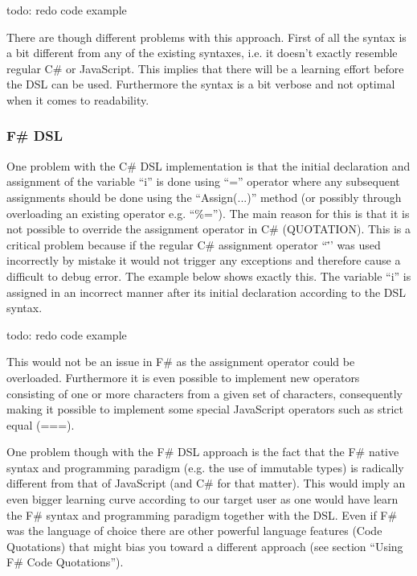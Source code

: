 			todo: redo code example

			There are though different problems with this approach. First of all the syntax is a bit different from any of the existing syntaxes, i.e. it doesn’t exactly resemble regular C\# or JavaScript. This implies that there will be a learning effort before the DSL can be used. Furthermore the syntax is a bit verbose and not optimal when it comes to readability.
		

		\subsubsection{F\# DSL} %
		\label{sub:fs_dsl}
			One problem with the C\# DSL implementation is that the initial declaration and assignment of the variable “i” is done using “=” operator where any subsequent assignments should be done using the ``Assign(...)'' method (or possibly through overloading an existing operator e.g. ``\%=''). The main reason for this is that it is not possible to override the assignment operator in C\# (QUOTATION). This is a critical problem because if the regular C\# assignment operator ``\='' was used incorrectly by mistake it would not trigger any exceptions and therefore cause a difficult to debug error.  The example below shows exactly this. The variable “i” is assigned in an incorrect manner after its initial declaration according to the DSL syntax.

			todo: redo code example

			This would not be an issue in F\# as the assignment operator could be overloaded. Furthermore it is even possible to implement new operators consisting of one or more characters from a given set of characters, consequently making it possible to implement some special JavaScript operators such as strict equal (===).

			One problem though with the F\# DSL approach is the fact that the F\# native syntax and programming paradigm (e.g. the use of immutable types) is radically different from that of JavaScript (and C\# for that matter). This would imply an even bigger learning curve according to our target user as one would have learn the F\# syntax and programming paradigm together with the DSL. Even if F\# was the language of choice there are other powerful language features (Code Quotations) that might bias you toward a different approach (see section ``Using F\# Code Quotations'').

